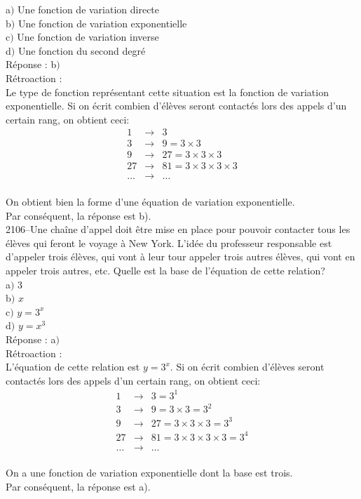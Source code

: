 \documentclass[letterpaper, 12pt]{article}
\begin{document}
a$)$ Une fonction de variation directe\\
b$)$ Une fonction de variation exponentielle\\
c$)$ Une fonction de variation inverse\\
d$)$ Une fonction du second degr\'e\\

R\'eponse : b$)$\\

R\'etroaction :\\
Le type de fonction repr\'esentant cette situation est la fonction de variation exponentielle. Si on \'ecrit combien d'\'el\`eves seront contact\'es lors des appels d'un certain rang, on obtient ceci:\\
\begin{eqnarray*}
 1 &\to& 3\\
3 &\to& 9 = 3 \times 3\\
9 &\to& 27 = 3 \times 3  \times 3\\
27 &\to& 81 = 3 \times 3  \times 3 \times 3\\
\ldots &\to& \ldots
\end{eqnarray*}\\
On obtient bien la forme d'une \'equation  de variation exponentielle.\\
Par cons\'equent, la r\'eponse est b).\\

2106--Une cha\^ine d'appel doit \^etre mise en place pour pouvoir contacter tous les \'el\`eves qui feront le voyage \`a New York. L'id\'ee du professeur responsable est d'appeler trois \'el\`eves, qui vont \`a leur tour appeler trois autres \'el\`eves, qui vont en appeler trois autres, etc. Quelle est la base de l'\'equation de cette relation? \\

a$)$ 3\\
b$)$ $x$\\
c$)$ $y=3^{x}$\\
d$)$ $y=x^{3}$\\

R\'eponse : a$)$\\

R\'etroaction :\\
L'\'equation de cette relation est $y=3^{x}$. Si on \'ecrit combien d'\'el\`eves seront contact\'es lors des appels d'un certain rang, on obtient ceci:\\
\begin{eqnarray*}
 1 &\to& 3 = 3^{1}\\
3 &\to& 9 = 3 \times 3 = 3^{2}\\
9 &\to& 27 = 3 \times 3  \times 3= 3^{3}\\
27 &\to& 81 = 3 \times 3  \times 3 \times 3= 3^{4}\\
\ldots &\to& \ldots
\end{eqnarray*}\\
On a une fonction de variation exponentielle dont la base est trois.\\
Par cons\'equent, la r\'eponse est a).\\
\end{document}
